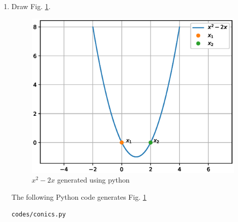 \renewcommand{\theequation}{\theenumi}
\begin{enumerate}[label=\thesection.\arabic*.,ref=\thesection.\theenumi]

\item Draw Fig. \ref{fig:quadeq}.

\begin{figure}[!ht]
\centering
\includegraphics[width=\columnwidth]{./figs/quadratic_equation.eps}
\caption{$x^2 -2x$ generated using python}
\label{fig:quadeq}
\end{figure} 

\solution The  following Python code generates Fig. \ref{fig:quadeq}

\begin{lstlisting}
codes/conics.py
\end{lstlisting}
\end{enumerate}

